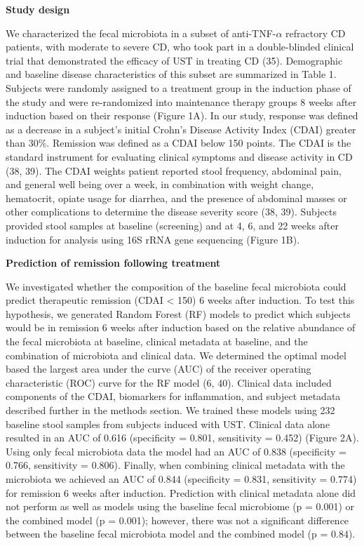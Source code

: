 \documentclass[12pt,]{article}
\begin{document}
\textbf{Study design}

We characterized the fecal microbiota in a subset of
anti-TNF-\({\alpha}\) refractory CD patients, with moderate to severe
CD, who took part in a double-blinded clinical trial that demonstrated
the efficacy of UST in treating CD (35). Demographic and baseline
disease characteristics of this subset are summarized in Table 1.
Subjects were randomly assigned to a treatment group in the induction
phase of the study and were re-randomized into maintenance therapy
groups 8 weeks after induction based on their response (Figure 1A). In
our study, response was defined as a decrease in a subject's initial
Crohn's Disease Activity Index (CDAI) greater than 30\%. Remission was
defined as a CDAI below 150 points. The CDAI is the standard instrument
for evaluating clinical symptoms and disease activity in CD (38, 39).
The CDAI weights patient reported stool frequency, abdominal pain, and
general well being over a week, in combination with weight change,
hematocrit, opiate usage for diarrhea, and the presence of abdominal
masses or other complications to determine the disease severity score
(38, 39). Subjects provided stool samples at baseline (screening) and at
4, 6, and 22 weeks after induction for analysis using 16S rRNA gene
sequencing (Figure 1B).

\textbf{Prediction of remission following treatment}

We investigated whether the composition of the baseline fecal microbiota
could predict therapeutic remission (CDAI \textless{} 150) 6 weeks after
induction. To test this hypothesis, we generated Random Forest (RF)
models to predict which subjects would be in remission 6 weeks after
induction based on the relative abundance of the fecal microbiota at
baseline, clinical metadata at baseline, and the combination of
microbiota and clinical data. We determined the optimal model based the
largest area under the curve (AUC) of the receiver operating
characteristic (ROC) curve for the RF model (6, 40). Clinical data
included components of the CDAI, biomarkers for inflammation, and
subject metadata described further in the methods section. We trained
these models using 232 baseline stool samples from subjects induced with
UST. Clinical data alone resulted in an AUC of 0.616 (specificity =
0.801, sensitivity = 0.452) (Figure 2A). Using only fecal microbiota
data the model had an AUC of 0.838 (specificity = 0.766, sensitivity =
0.806). Finally, when combining clinical metadata with the microbiota we
achieved an AUC of 0.844 (specificity = 0.831, sensitivity = 0.774) for
remission 6 weeks after induction. Prediction with clinical metadata
alone did not perform as well as models using the baseline fecal
microbiome (p = 0.001) or the combined model (p = 0.001); however, there
was not a significant difference between the baseline fecal microbiota
model and the combined model (p = 0.84).
\end{document}
